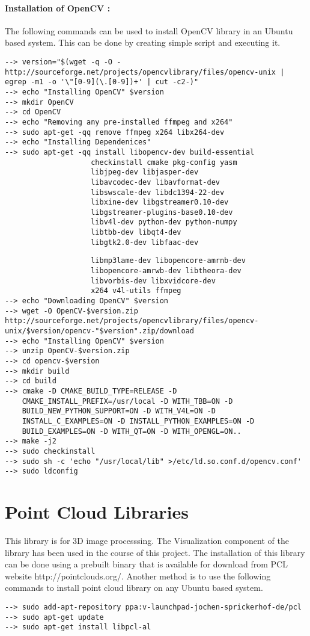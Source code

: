 \paragraph{Installation of OpenCV :}
The following commands can be used to install OpenCV library in an Ubuntu based system. This can be done by creating simple script and executing it.
\begin{lstlisting}
--> version="$(wget -q -O - http://sourceforge.net/projects/opencvlibrary/files/opencv-unix | egrep -m1 -o '\"[0-9](\.[0-9])+' | cut -c2-)"
--> echo "Installing OpenCV" $version
--> mkdir OpenCV
--> cd OpenCV
--> echo "Removing any pre-installed ffmpeg and x264"
--> sudo apt-get -qq remove ffmpeg x264 libx264-dev
--> echo "Installing Dependenices"
--> sudo apt-get -qq install libopencv-dev build-essential 
					checkinstall cmake pkg-config yasm 
					libjpeg-dev libjasper-dev 
	   				libavcodec-dev libavformat-dev
	 				libswscale-dev libdc1394-22-dev 
					libxine-dev libgstreamer0.10-dev 
					libgstreamer-plugins-base0.10-dev
					libv4l-dev python-dev python-numpy
				    libtbb-dev libqt4-dev
					libgtk2.0-dev libfaac-dev 
\end{lstlisting}
\pagebreak
\begin{lstlisting}
					libmp3lame-dev libopencore-amrnb-dev 
					libopencore-amrwb-dev libtheora-dev
    				libvorbis-dev libxvidcore-dev 
    				x264 v4l-utils ffmpeg
--> echo "Downloading OpenCV" $version
--> wget -O OpenCV-$version.zip http://sourceforge.net/projects/opencvlibrary/files/opencv-unix/$version/opencv-"$version".zip/download
--> echo "Installing OpenCV" $version
--> unzip OpenCV-$version.zip
--> cd opencv-$version
--> mkdir build
--> cd build
--> cmake -D CMAKE_BUILD_TYPE=RELEASE -D 
    CMAKE_INSTALL_PREFIX=/usr/local -D WITH_TBB=ON -D 
    BUILD_NEW_PYTHON_SUPPORT=ON -D WITH_V4L=ON -D 
    INSTALL_C_EXAMPLES=ON -D INSTALL_PYTHON_EXAMPLES=ON -D 
    BUILD_EXAMPLES=ON -D WITH_QT=ON -D WITH_OPENGL=ON..
--> make -j2
--> sudo checkinstall
--> sudo sh -c 'echo "/usr/local/lib" >/etc/ld.so.conf.d/opencv.conf'
--> sudo ldconfig
\end{lstlisting}
\section{Point Cloud Libraries}
This library is for 3D image processsing. The Visualization component of the library has been used in the course of this project. The installation of this library can be done using a prebuilt binary that is available for download from PCL website http://pointclouds.org/.
Another method is to use the following commands to install point cloud library on any Ubuntu based system.
\begin{lstlisting}
--> sudo add-apt-repository ppa:v-launchpad-jochen-sprickerhof-de/pcl
--> sudo apt-get update
--> sudo apt-get install libpcl-al
\end{lstlisting}


